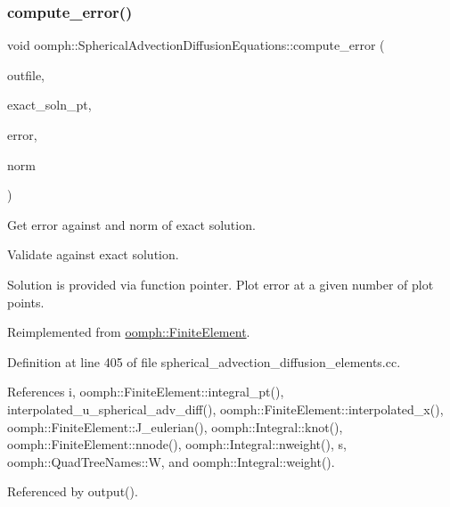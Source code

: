 \subsubsection{\texorpdfstring{compute\+\_\+error()}{compute\_error()}}
{\footnotesize\ttfamily void oomph\+::\+Spherical\+Advection\+Diffusion\+Equations\+::compute\+\_\+error (\begin{DoxyParamCaption}\item[{std\+::ostream \&}]{outfile,  }\item[{\hyperlink{classoomph_1_1FiniteElement_a690fd33af26cc3e84f39bba6d5a85202}{Finite\+Element\+::\+Steady\+Exact\+Solution\+Fct\+Pt}}]{exact\+\_\+soln\+\_\+pt,  }\item[{double \&}]{error,  }\item[{double \&}]{norm }\end{DoxyParamCaption})\hspace{0.3cm}{\ttfamily [virtual]}}



Get error against and norm of exact solution. 

Validate against exact solution.

Solution is provided via function pointer. Plot error at a given number of plot points. 

Reimplemented from \hyperlink{classoomph_1_1FiniteElement_a73c79a1f1e5b1d334757812a6bbd58ff}{oomph\+::\+Finite\+Element}.



Definition at line 405 of file spherical\+\_\+advection\+\_\+diffusion\+\_\+elements.\+cc.



References i, oomph\+::\+Finite\+Element\+::integral\+\_\+pt(), interpolated\+\_\+u\+\_\+spherical\+\_\+adv\+\_\+diff(), oomph\+::\+Finite\+Element\+::interpolated\+\_\+x(), oomph\+::\+Finite\+Element\+::\+J\+\_\+eulerian(), oomph\+::\+Integral\+::knot(), oomph\+::\+Finite\+Element\+::nnode(), oomph\+::\+Integral\+::nweight(), s, oomph\+::\+Quad\+Tree\+Names\+::W, and oomph\+::\+Integral\+::weight().



Referenced by output().

\mbox{\label{classoomph_1_1SphericalAdvectionDiffusionEquations_aec614fe14108871e1c47345b8cac97d7}} 
